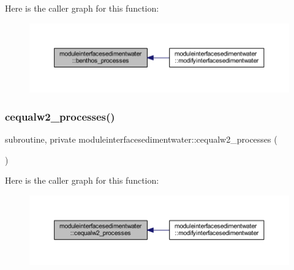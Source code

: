 Here is the caller graph for this function\+:\nopagebreak
\begin{figure}[H]
\begin{center}
\leavevmode
\includegraphics[width=350pt]{namespacemoduleinterfacesedimentwater_a6fc6699ed26c842c7951c9c436867a65_icgraph}
\end{center}
\end{figure}
\mbox{\label{namespacemoduleinterfacesedimentwater_aa03ae3c533041dd1f82ad0796e923671}} 
\subsubsection{\texorpdfstring{cequalw2\+\_\+processes()}{cequalw2\_processes()}}
{\footnotesize\ttfamily subroutine, private moduleinterfacesedimentwater\+::cequalw2\+\_\+processes (\begin{DoxyParamCaption}{ }\end{DoxyParamCaption})\hspace{0.3cm}{\ttfamily [private]}}

Here is the caller graph for this function\+:\nopagebreak
\begin{figure}[H]
\begin{center}
\leavevmode
\includegraphics[width=350pt]{namespacemoduleinterfacesedimentwater_aa03ae3c533041dd1f82ad0796e923671_icgraph}
\end{center}
\end{figure}
\mbox{\label{namespacemoduleinterfacesedimentwater_af1236045d4bf3e91947d80c8c3140745}} 
